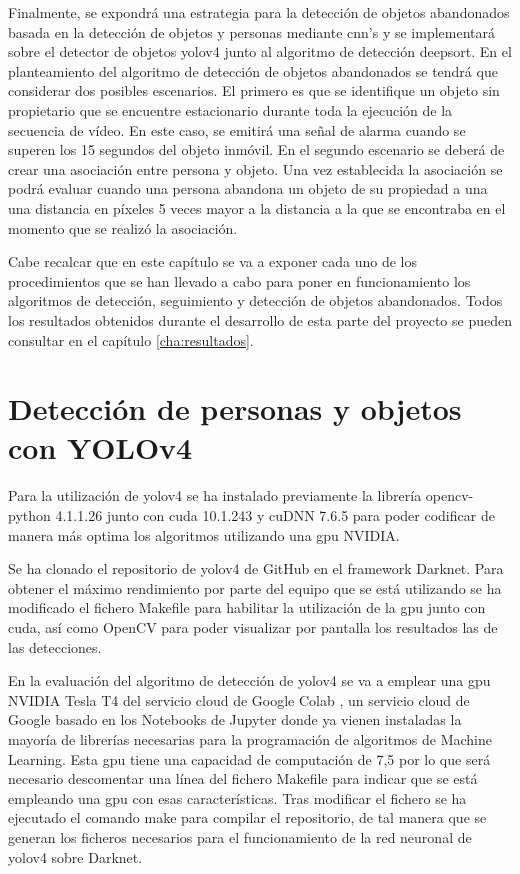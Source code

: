 Finalmente, se expondrá una estrategia para la detección de objetos abandonados basada en la detección de objetos y personas mediante \gls{cnn}'s y se implementará sobre el detector de objetos \gls{yolov4} junto al algoritmo de detección \gls{deepsort}. En el planteamiento del algoritmo de detección de objetos abandonados se tendrá que considerar dos posibles escenarios. El primero es que se identifique un objeto sin propietario que se encuentre estacionario durante toda la ejecución de la secuencia de vídeo. En este caso, se emitirá una señal de alarma cuando se superen los 15 segundos del objeto inmóvil. En el segundo escenario se deberá de crear una asociación entre persona y objeto. Una vez establecida la asociación se podrá evaluar cuando una persona abandona un objeto de su propiedad a una una distancia en píxeles 5 veces mayor a la distancia a la que se encontraba en el momento que se realizó la asociación.

Cabe recalcar que en este capítulo se va a exponer cada uno de los procedimientos que se han llevado a cabo para poner en funcionamiento los algoritmos de detección, seguimiento y detección de objetos abandonados. Todos los resultados obtenidos durante el desarrollo de esta parte del proyecto se pueden consultar en el capítulo \ref{cha:resultados}.

\section{Detección de personas y objetos con YOLOv4}
\label{sec:desarrollo-yolov4}

Para la utilización de \gls{yolov4} se ha instalado previamente la librería opencv-python 4.1.1.26 junto con \gls{cuda} 10.1.243 y cuDNN 7.6.5 para poder codificar de manera más optima los algoritmos utilizando una \gls{gpu} NVIDIA.

Se ha clonado el repositorio de \gls{yolov4} de GitHub \cite{yolov4-darknet-github} en el framework Darknet. Para obtener el máximo rendimiento por parte del equipo que se está utilizando se ha modificado el fichero Makefile para habilitar la utilización de la \gls{gpu} junto con \gls{cuda}, así como OpenCV para poder visualizar por pantalla los resultados las de las detecciones.

En la evaluación del algoritmo de detección de \gls{yolov4} se va a emplear una \gls{gpu} NVIDIA Tesla T4 del servicio cloud de Google Colab \cite{google-colab}, un servicio cloud de Google basado en los Notebooks de Jupyter donde ya vienen instaladas la mayoría de librerías necesarias para la programación de algoritmos de Machine Learning. Esta \gls{gpu} tiene una capacidad de computación de 7,5 por lo que será necesario descomentar una línea del fichero Makefile para indicar que se está empleando una \gls{gpu} con esas características. Tras modificar el fichero se ha ejecutado el comando make para compilar el repositorio, de tal manera que se generan los ficheros necesarios para el funcionamiento de la red neuronal de \gls{yolov4} sobre Darknet. 

